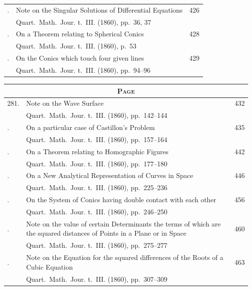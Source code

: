 \documentclass[11pt,a4paper]{book}
\begin{document}
\begin{longtable}{p{0.5in}p{3.8in}p{0.4in}}
\addlinespace
278. & Note on the Singular Solutions of Differential Equations \dotfill & 426 \\
& \quad Quart.\ Math.\ Jour. t.~III. (1860), pp.~36, 37 & \\
\addlinespace
279. & On a Theorem relating to Spherical Conics \dotfill & 428 \\
& \quad Quart.\ Math.\ Jour. t.~III. (1860), p.~53 & \\
\addlinespace
280. & On the Conics which touch four given lines \dotfill & 429 \\
& \quad Quart.\ Math.\ Jour. t.~III. (1860), pp.~94--96 & \\
\end{longtable}
\newpage

\thispagestyle{empty}
\begin{longtable}{p{0.5in}p{3.8in}p{0.4in}}
\multicolumn{3}{c}{\textsc{Page}} \\
\midrule
\endhead
281. & Note on the Wave Surface \dotfill & 432 \\
& \quad Quart.\ Math.\ Jour. t.~III. (1860), pp.~142--144 & \\
\addlinespace
282. & On a particular case of Castillon's Problem \dotfill & 435 \\
& \quad Quart.\ Math.\ Jour. t.~III. (1860), pp.~157--164 & \\
\addlinespace
283. & On a Theorem relating to Homographic Figures \dotfill & 442 \\
& \quad Quart.\ Math.\ Jour. t.~III. (1860), pp.~177--180 & \\
\addlinespace
284. & On a New Analytical Representation of Curves in Space \dotfill & 446 \\
& \quad Quart.\ Math.\ Jour. t.~III. (1860), pp.~225--236 & \\
\addlinespace
285. & On the System of Conics having double contact with each other \dotfill & 456 \\
& \quad Quart.\ Math.\ Jour. t.~III. (1860), pp.~246--250 & \\
\addlinespace
286. & Note on the value of certain Determinants the terms of which are the squared distances of Points in a Plane or in Space \dotfill & 460 \\
& \quad Quart.\ Math.\ Jour. t.~III. (1860), pp.~275--277 & \\
\addlinespace
287. & Note on the Equation for the squared differences of the Roots of a Cubic Equation \dotfill & 463 \\
& \quad Quart.\ Math.\ Jour. t.~III. (1860), pp.~307--309 & \\

\end{longtable}
\end{document}
